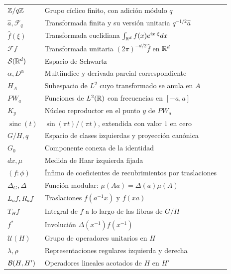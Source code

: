\begin{longtable}{@{}p{}p{}r@{}}
$\mathbb Z/q\mathbb Z$ & Grupo cíclico finito, con adición módulo $q$ & \pageref{cap:v4-05}\\
$\widehat a,\mathcal F_q$ & Transformada finita y su versión unitaria $q^{-1/2}\widehat a$ & \pageref{cap:v4-05}\\
$\widehat f(\xi)$ & Transformada euclidiana $\int_{\mathbb R^d}f(x)e^{ix\cdot\xi}dx$ & \pageref{cap:v4-07}\\
$\mathcal F f$ & Transformada unitaria $(2\pi)^{-d/2}\widehat f$ en $\mathbb R^d$ & \pageref{cap:v4-08}\\
$\mathcal S(\mathbb R^d)$ & Espacio de Schwartz & \pageref{cap:v4-07}\\
$\alpha,D^\alpha$ & Multiíndice y derivada parcial correspondiente & \pageref{cap:v4-07}\\
$H_A$ & Subespacio de $L^2$ cuyo transformado se anula en $A$ & \pageref{cap:v4-08}\\
$PW_a$ & Funciones de $L^2(\mathbb R)$ con frecuencias en $[-a,a]$ & \pageref{cap:v4-08}\\
$K_y$ & Núcleo reproductor en el punto $y$ de $PW_a$ & \pageref{cap:v4-08}\\
$\operatorname{sinc}(t)$ & $\sin(\pi t)/(\pi t)$, extendida con valor $1$ en cero & \pageref{cap:v4-08}\\
$G/H,q$ & Espacio de clases izquierdas y proyección canónica & \pageref{cap:v4-09}\\
$G_0$ & Componente conexa de la identidad & \pageref{cap:v4-09}\\
$dx,\mu$ & Medida de Haar izquierda fijada & \pageref{cap:v4-10}\\
$(f:\phi)$ & Ínfimo de coeficientes de recubrimientos por traslaciones & \pageref{v4:haar-recubrimientos}\\
$\Delta_G,\Delta$ & Función modular: $\mu(Aa)=\Delta(a)\mu(A)$ & \pageref{v4:mod-convencion}\\
$L_af,R_af$ & Traslaciones $f(a^{-1}x)$ y $f(xa)$ & \pageref{cap:v4-11}\\
$T_Hf$ & Integral de $f$ a lo largo de las fibras de $G/H$ & \pageref{v4:mod-promedio}\\
$f^*$ & Involución $\Delta(x^{-1})\overline{f(x^{-1})}$ & \pageref{cap:v4-12}\\
$\mathcal U(H)$ & Grupo de operadores unitarios en $H$ & \pageref{cap:v4-13}\\
$\lambda,\rho$ & Representaciones regulares izquierda y derecha & \pageref{v4:rep-regulares}\\
$\mathcal B(H,H')$ & Operadores lineales acotados de $H$ en $H'$ & \pageref{cap:v4-13}\\

\end{longtable}
